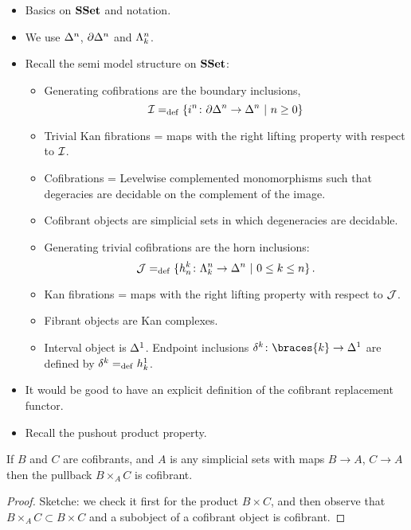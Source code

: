 \documentclass[reqno,10pt,a4paper,oneside,draft]{amsart}
\begin{document}
\begin{itemize}
\item Basics on $\SSet$ and notation. 
\item We use $\Delt{n}$, $\partial \Delt{n}$ and $\Horn{k}{n}$.
\item Recall the semi model structure on $\SSet$:
\begin{itemize}
\item Generating cofibrations are the boundary inclusions, 
\[
\cal{I} \defeq \{ \inc{n} \co  \partial \Delt{n} \to \Delt{n} \ | \ n \geq 0 \}
\]
\item Trivial Kan fibrations = maps with the right lifting property with respect to $\cal{I}$.
\item Cofibrations = Levelwise complemented monomorphisms such that degeracies are decidable on the complement of the image. 
\item Cofibrant objects are simplicial sets in which degeneracies are decidable.
\item Generating trivial cofibrations are the horn inclusions:
\[
\cal{J} \defeq \{ \horninc{k}{n}  \co \Horn{k}{n} \to \Delt{n} \ | \ 0 \leq k \leq n \} \, .
\]
\item Kan fibrations = maps with the right lifting property with respect to $\cal{J}$.
\item Fibrant objects are Kan complexes.
\item Interval object is $\Delt{1}$. Endpoint inclusions $\kcyl \co \braces{ k} \to \Delt{1}$ are
defined by $\kcyl \defeq \horninc{1}{k}$.
\end{itemize}
\item It would be good to have an explicit definition of the cofibrant replacement functor.
\item Recall the pushout product property.
\end{itemize}






\begin{lemma}
If $B$ and $C$ are cofibrants, and $A$ is any simplicial sets with maps $B \rightarrow A$, $C \rightarrow A$ then the pullback $B \times_{A} C$ is cofibrant.
\end{lemma}

\begin{proof}
Sketche: we check it first for the product $B \times C$, and then observe that $B \times_A C \subset B \times C$ and a subobject of a cofibrant object is cofibrant.
\end{proof}
\end{document}
